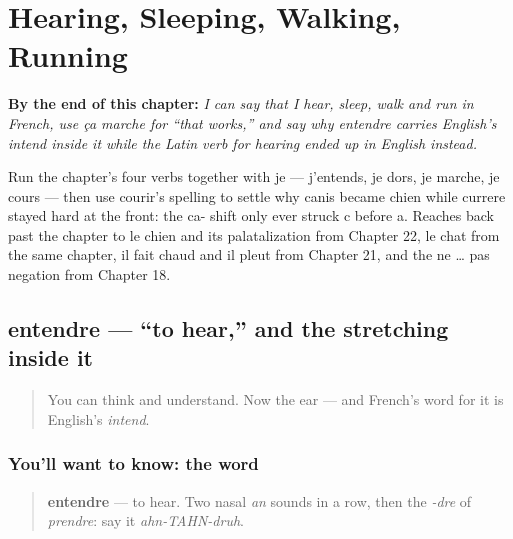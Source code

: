 
\chapter{Hearing, Sleeping, Walking, Running}
\label{ch:fr-hearing-sleeping-walking-running}

\begin{chapteropening}
\textbf{By the end of this chapter:} \emph{I can say that I hear, sleep, walk and run in French, use ça marche for \textquotedblleft{}that works,\textquotedblright{} and say why entendre carries English's intend inside it while the Latin verb for hearing ended up in English instead.}

Run the chapter's four verbs together with je — j'entends, je dors, je marche, je cours — then use courir's spelling to settle why canis became chien while currere stayed hard at the front: the ca- shift only ever struck c before a. Reaches back past the chapter to le chien and its palatalization from Chapter 22, le chat from the same chapter, il fait chaud and il pleut from Chapter 21, and the ne … pas negation from Chapter 18.
\end{chapteropening}

\section[entendre]{entendre — \textquotedblleft{}to hear,\textquotedblright{} and the stretching inside it}

\label{lesson:FR-C26-entendre}



\begin{quote}
You can think and understand. Now the ear — and French's word for it is English's \emph{intend}.
\end{quote}

\subsection*{You'll want to know: the word}
\begin{quote}
\textbf{entendre} — to hear. Two nasal \emph{an} sounds in a row, then the \emph{-dre} of \emph{prendre}: say it \emph{ahn-TAHN-druh}.
\end{quote}

